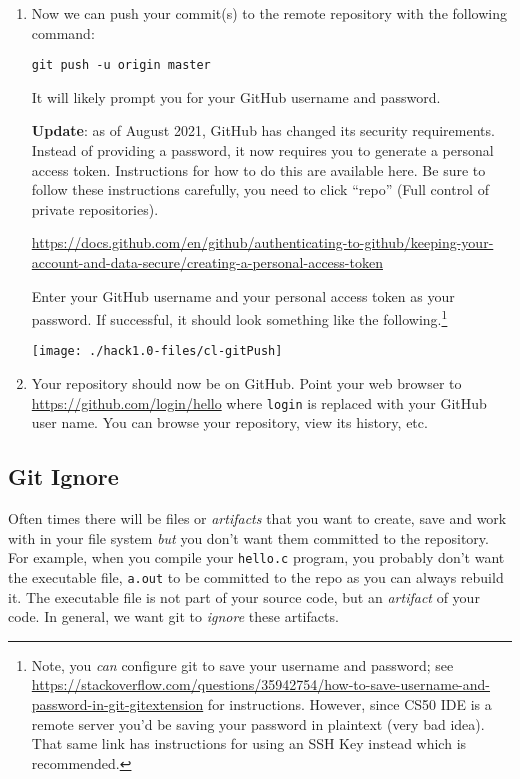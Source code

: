 \documentclass[12pt]{scrartcl}
\begin{document}
\begin{enumerate}
  \item Now we can push your commit(s) to the remote repository
  with the following command:
  
  \texttt{git push -u origin master}
  
  It will likely prompt you for your GitHub username and password.

  \textbf{Update}: as of August 2021, GitHub has changed its security
  requirements.  Instead of providing a password, it now requires you
  to generate a personal access token.  Instructions for how to do this
  are available here.  Be sure to follow these instructions carefully,
  you need to click ``repo'' (Full control of private repositories).
  
  \url{https://docs.github.com/en/github/authenticating-to-github/keeping-your-account-and-data-secure/creating-a-personal-access-token}
  
  Enter your GitHub username and your personal access token as your
  password.  If successful, it should look something like
  the following.\footnote{Note, you \emph{can} configure git 
  to save your username and password; see \url{https://stackoverflow.com/questions/35942754/how-to-save-username-and-password-in-git-gitextension} for
  instructions.  However, since CS50 IDE is a remote server you'd
  be saving your password in plaintext (very bad idea).  That same
  link has instructions for using an SSH Key instead which is
  recommended.}
  
  \begin{center}
  \texttt{[image: ./hack1.0-files/cl-gitPush]}
  \end{center}

  \item Your repository should now be on GitHub.
  Point your web browser to \url{https://github.com/login/hello}
  where \texttt{login} is replaced with your GitHub user
  name.  You can browse your repository, view its history, etc.
  
\end{enumerate}

\subsection{Git Ignore}

Often times there will be files or \emph{artifacts} that you want 
to create, save and work with in your file system \emph{but} you 
don't want them committed to the repository.  For example, when
you compile your \texttt{hello.c} program, you probably
don't want the executable file, \texttt{a.out} to be
committed to the repo as you can always rebuild it.  The executable
file is not part of your source code, but an \emph{artifact} of your 
code.  In general, we want git to \emph{ignore} these artifacts.
\end{document}

